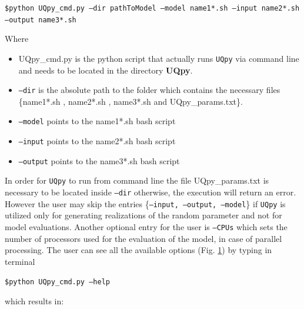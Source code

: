 \documentclass[preprint,12pt]{elsarticle}
\begin{document}
\vspace{4mm}
\noindent
{\scriptsize \texttt{\$python UQpy\_cmd.py --dir pathToModel --model name1*.sh --input name2*.sh --output name3*.sh}}


\vspace{4mm}
\noindent
Where

\begin{itemize}
 \item  {\color{blue} UQpy\_cmd.py} is the python script that actually runs \texttt{UQpy}  via command line and needs to be located in the directory \textbf{UQpy}.
 
 \item \texttt{--dir} is the absolute path to the folder which contains the necessary files  {\{\color{red}name1*.sh} , {\color{red}name2*.sh} , {\color{red}name3*.sh} and {\color{magenta}UQpy\_params.txt}\}.
 
 \item \texttt{--model} points to the {\color{red}name1*.sh} bash script
 
  \item \texttt{--input} points to the {\color{red}name2*.sh} bash script
  
   \item \texttt{--output} points to the {\color{red}name3*.sh} bash script
 
 \end{itemize}


\noindent
In order for \texttt{UQpy}  to run from command line  the file  {\color{magenta}UQpy\_params.txt} is necessary to be located inside \texttt{--dir} otherwise, the execution will return an error. However the user may skip the entries \{\texttt{--input, --output, --model}\}  if  \texttt{UQpy}  is utilized only for generating realizations of the random parameter and not for model evaluations.  Another optional entry for the user is \texttt{--CPUs} which sets the number of processors used for the evaluation of the model, in case of parallel processing.   The user can see all the available options (Fig. \ref{UQpy_help}) by typing in terminal

\vspace{4mm}
{\centering
	{\small \texttt{\$python UQpy\_cmd.py --help}}\par}
\vspace{4mm}


\noindent
which results in:

\begin{figure}[!ht]
	\caption{}
	\label{UQpy_help}
\end{figure}
\end{document}
